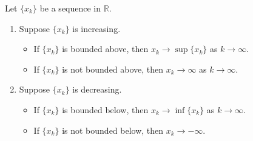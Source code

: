 \documentclass[notoc,notitlepage]{tufte-book}
\begin{document}
\begin{thm}\label{thm:monotone_convergence_theorem}
  Let $\{x_k\}$ be a sequence in $\mathbb{R}$.
  \begin{enumerate}
    \item Suppose $\{x_k\}$ is increasing.
      \begin{itemize}
        \item If $\{ x_k \}$ is bounded above, then $x_k \to \sup \{ x_k \}$ as $k \to \infty$.
        \item If $\{ x_k \}$ is not bounded above, then $x_k \to \infty$ as $k \to \infty$.
      \end{itemize}
    \item Suppose $\{ x_k \}$ is decreasing.
      \begin{itemize}
        \item If $\{ x_k \}$ is bounded below, then $x_k \to \inf \{ x_k \}$ as $k \to \infty$.
        \item If $\{ x_k \}$ is not bounded below, then $x_k \to -\infty$.
      \end{itemize}
  \end{enumerate}
\end{thm}


\backmatter\

\pagestyle{plain}



\printindex
\end{document}
